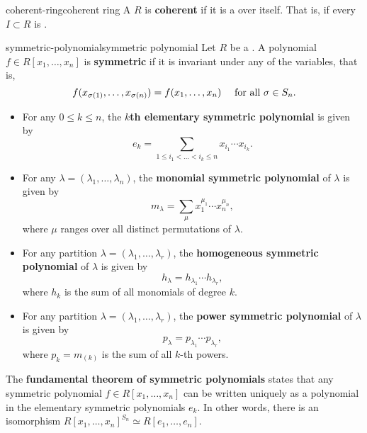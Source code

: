 \begin{topic}{coherent-ring}{coherent ring}
    A  $R$ is \textbf{coherent} if it is a  over itself. That is, if every   $I \subset R$ is .
\end{topic}

\begin{topic}{symmetric-polynomial}{symmetric polynomial}
    Let $R$ be a . A polynomial $f \in R[x_1, \ldots, x_n]$ is \textbf{symmetric} if it is invariant under any  of the variables, that is,
    \[ f(x_{\sigma(1)}, \ldots, x_{\sigma(n)}) = f(x_1, \ldots, x_n) \quad \textup{ for all } \sigma \in S_n . \]
    \begin{itemize}
        \item For any $0 \le k \le n$, the \textbf{$k$th elementary symmetric polynomial} is given by
        \[ e_k = \sum_{1 \le i_1 < \ldots < i_k \le n} x_{i_1} \cdots x_{i_k} . \]
        \item For any  $\lambda = (\lambda_1, \ldots, \lambda_n)$, the \textbf{monomial symmetric polynomial} of $\lambda$ is given by
        \[ m_\lambda = \sum_{\mu} x_1^{\mu_1} \cdots x_n^{\mu_n} , \]
        where $\mu$ ranges over all distinct permutations of $\lambda$.
        \item For any partition $\lambda = (\lambda_1, \ldots, \lambda_r)$, the \textbf{homogeneous symmetric polynomial} of $\lambda$ is given by
        \[ h_\lambda = h_{\lambda_1} \cdots h_{\lambda_r} , \]
        where $h_k$ is the sum of all monomials of degree $k$.
        \item For any partition $\lambda = (\lambda_1, \ldots, \lambda_r)$, the \textbf{power symmetric polynomial} of $\lambda$ is given by
        \[ p_\lambda = p_{\lambda_1} \cdots p_{\lambda_r} , \]
        where $p_k = m_{(k)}$ is the sum of all $k$-th powers.
    \end{itemize}
    The \textbf{fundamental theorem of symmetric polynomials} states that any symmetric polynomial $f \in R[x_1, \ldots, x_n]$ can be written uniquely as a polynomial in the elementary symmetric polynomials $e_k$. In other words, there is an isomorphism $R[x_1, \ldots, x_n]^{S_n} \simeq R[e_1, \ldots, e_n]$.
\end{topic}


